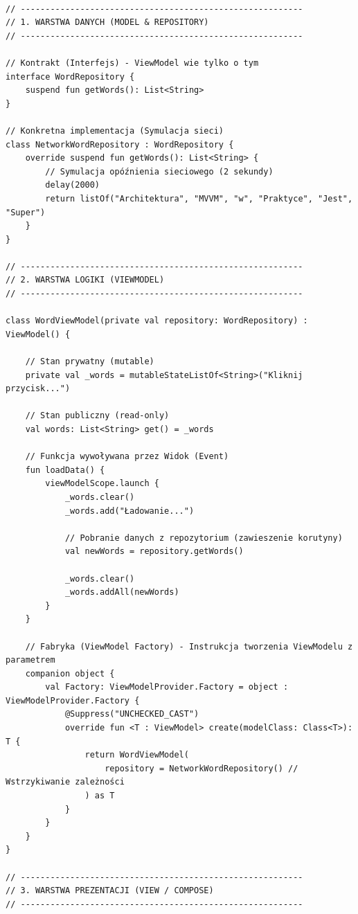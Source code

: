\begin{verbatim}

// ---------------------------------------------------------
// 1. WARSTWA DANYCH (MODEL & REPOSITORY)
// ---------------------------------------------------------

// Kontrakt (Interfejs) - ViewModel wie tylko o tym
interface WordRepository {
    suspend fun getWords(): List<String>
}

// Konkretna implementacja (Symulacja sieci)
class NetworkWordRepository : WordRepository {
    override suspend fun getWords(): List<String> {
        // Symulacja opóźnienia sieciowego (2 sekundy)
        delay(2000)
        return listOf("Architektura", "MVVM", "w", "Praktyce", "Jest", "Super")
    }
}

// ---------------------------------------------------------
// 2. WARSTWA LOGIKI (VIEWMODEL)
// ---------------------------------------------------------

class WordViewModel(private val repository: WordRepository) : ViewModel() {

    // Stan prywatny (mutable)
    private val _words = mutableStateListOf<String>("Kliknij przycisk...")
    
    // Stan publiczny (read-only)
    val words: List<String> get() = _words

    // Funkcja wywoływana przez Widok (Event)
    fun loadData() {
        viewModelScope.launch {
            _words.clear()
            _words.add("Ładowanie...")
            
            // Pobranie danych z repozytorium (zawieszenie korutyny)
            val newWords = repository.getWords()
            
            _words.clear()
            _words.addAll(newWords)
        }
    }

    // Fabryka (ViewModel Factory) - Instrukcja tworzenia ViewModelu z parametrem
    companion object {
        val Factory: ViewModelProvider.Factory = object : ViewModelProvider.Factory {
            @Suppress("UNCHECKED_CAST")
            override fun <T : ViewModel> create(modelClass: Class<T>): T {
                return WordViewModel(
                    repository = NetworkWordRepository() // Wstrzykiwanie zależności
                ) as T
            }
        }
    }
}

// ---------------------------------------------------------
// 3. WARSTWA PREZENTACJI (VIEW / COMPOSE)
// ---------------------------------------------------------


\end{verbatim}
